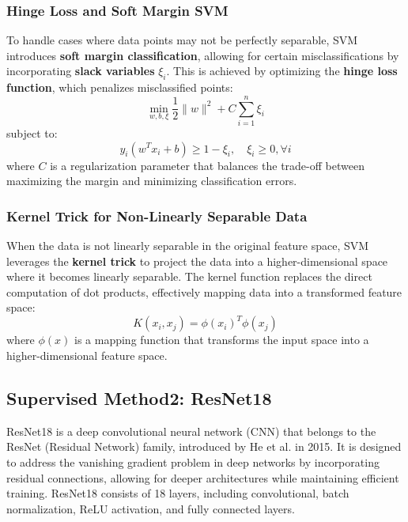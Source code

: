 \documentclass[12pt]{article}
\begin{document}
        \subsubsection{Hinge Loss and Soft Margin SVM}  
        To handle cases where data points may not be perfectly separable, SVM introduces \textbf{soft margin classification}, allowing for certain misclassifications by incorporating \textbf{slack variables} \( \xi_i \). This is achieved by optimizing the \textbf{hinge loss function}, which penalizes misclassified points:  
        \begin{equation*}
            \min_{w, b, \xi} \frac{1}{2} \|w\|^2 + C \sum_{i=1}^{n} \xi_i
        \end{equation*}  
        subject to:  
        \begin{equation*}
            y_i (w^T x_i + b) \geq 1 - \xi_i, \quad \xi_i \geq 0, \forall i
        \end{equation*}  
        where \( C \) is a regularization parameter that balances the trade-off between maximizing the margin and minimizing classification errors.
    
        \subsubsection{Kernel Trick for Non-Linearly Separable Data}
        When the data is not linearly separable in the original feature space, SVM leverages the \textbf{kernel trick} to project the data into a higher-dimensional space where it becomes linearly separable. The kernel function replaces the direct computation of dot products, effectively mapping data into a transformed feature space:  
        \begin{equation*}
            K(x_i, x_j) = \phi(x_i)^T \phi(x_j)
        \end{equation*}  
        where \( \phi(x) \) is a mapping function that transforms the input space into a higher-dimensional feature space.
    
        \subsection{Supervised Method2: ResNet18}  
        ResNet18 is a deep convolutional neural network (CNN) that belongs to the ResNet (Residual Network) family, introduced by He et al. in 2015. It is designed to address the vanishing gradient problem in deep networks by incorporating residual connections, allowing for deeper architectures while maintaining efficient training. ResNet18 consists of 18 layers, including convolutional, batch normalization, ReLU activation, and fully connected layers.
    
\end{document}

